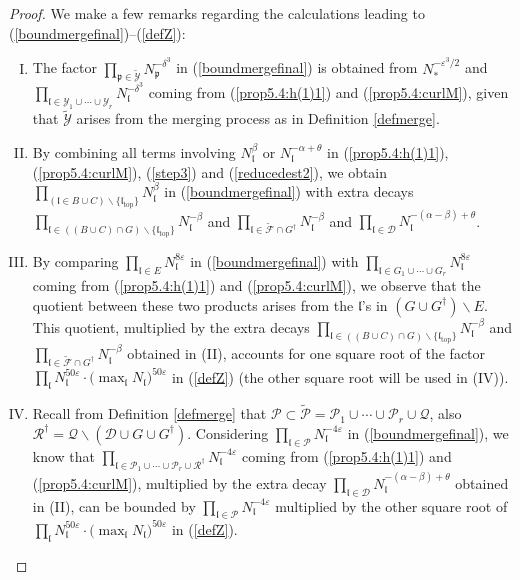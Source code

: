 \documentclass[11 pt,reqno]{amsart}
\theoremstyle{definition}
\theoremstyle{remark}
\numberwithin{equation}{section}
\newcommand{\Dc}{\mathcal{D}}
\newcommand{\Fc}{\mathcal{F}}
\newcommand{\Pc}{\mathcal{P}}
\newcommand{\Qc}{\mathcal{Q}}
\newcommand{\Rc}{\mathcal{R}}
\newcommand{\Yc}{\mathcal{Y}}
\newcommand{\pf}{\mathfrak{p}}
\newcommand{\lf}{\mathfrak{l}}
\begin{document}
{\begin{proof}
 We make a few remarks regarding the calculations leading to (\ref{boundmergefinal})--(\ref{defZ}):
 \begin{enumerate}[(I)]
 \item The factor $\prod_{\pf\in\widetilde{\Yc}}N_\pf^{-\delta^3}$ in (\ref{boundmergefinal}) is obtained from $N_*^{-\varepsilon^3/2}$ and $\prod_{\lf\in\Yc_1\cup\cdots\cup\Yc_r}N_\lf^{-\delta^3}$ coming from (\ref{prop5.4:h(1)1}) and (\ref{prop5.4:curlM}), given that  $\widetilde{\Yc}$ arises from the merging process  as in Definition \ref{defmerge}.
 \item By combining all terms involving $N_\lf^{\beta}$ or $N_\lf^{-\alpha+\theta}$ in (\ref{prop5.4:h(1)1}), (\ref{prop5.4:curlM}), (\ref{step3}) and (\ref{reducedest2}), we obtain $\prod_{(\lf\in B\cup C)\backslash\{\lf_{\mathrm{top}}\}}N_\lf^\beta$ in (\ref{boundmergefinal}) with extra decays $\prod_{\lf\in ((B\cup C)\cap G)\backslash\{\lf_{\mathrm{top}}\}}N_\lf^{-\beta}$ and $\prod_{\lf\in \widetilde{\Fc}\cap G^\dagger}N_\lf^{-\beta}$ and $\prod_{\lf\in\Dc} N_\lf^{-(\alpha-\beta)+\theta}$.
 \item By comparing $\prod_{\lf\in E}N_\lf^{8\varepsilon}$ in (\ref{boundmergefinal}) with $\prod_{\lf\in G_1\cup\cdots\cup G_r}N_\lf^{8\varepsilon}$ coming from (\ref{prop5.4:h(1)1}) and (\ref{prop5.4:curlM}), we observe that the quotient between these two products arises from the $\lf$'s in $(G\cup G^\dagger)\backslash E$. This quotient, multiplied by the extra decays $\prod_{\lf\in ((B\cup C)\cap G)\backslash\{\lf_{\mathrm{top}}\}}N_\lf^{-\beta}$ and $\prod_{\lf\in \widetilde{\Fc}\cap G^\dagger}N_\lf^{-\beta}$ obtained in (II), accounts for one square root of the factor $\prod_{\lf}N_\lf^{50\varepsilon}\cdot\big(\max_\lf N_\lf\big)^{50\varepsilon}$ in (\ref{defZ}) (the other square root will be used in (IV)).
 \item Recall from Definition \ref{defmerge} that $\Pc\subset\widetilde{\Pc}= \Pc_1\cup\cdots\cup \Pc_r \cup \Qc$, also $\Rc^\dagger = \Qc\backslash (\Dc\cup G\cup G^\dagger)$. Considering
 $\prod_{\lf\in\Pc}N_\lf^{-4\varepsilon}$ in (\ref{boundmergefinal}), we know that $\prod_{\lf\in\Pc_1\cup\cdots\cup\Pc_r\cup\Rc^\dagger}N_\lf^{-4\varepsilon}$ coming from (\ref{prop5.4:h(1)1}) and (\ref{prop5.4:curlM}), multiplied by the extra decay $\prod_{\lf\in\Dc} N_\lf^{-(\alpha-\beta)+\theta}$ obtained in (II), can be bounded by $\prod_{\lf\in\Pc}N_\lf^{-4\varepsilon}$  multiplied by the other square root of $\prod_{\lf}N_\lf^{50\varepsilon}\cdot\big(\max_\lf N_\lf\big)^{50\varepsilon}$ in (\ref{defZ}).
 \end{enumerate}
 

\end{proof}}
\end{document}
